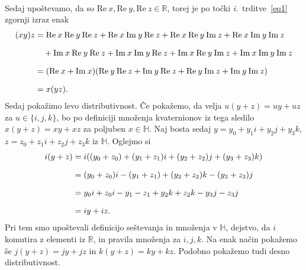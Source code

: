 \documentclass[mat1, tisk]{fmfdelo}
\numberwithin{equation}{section}
\begin{document}
\begin{dokaz}
\begin{equation*}
\begin{aligned}
                \end{aligned}
        \end{equation*}
        Sedaj upoštevamo, da so $\mathrm{Re} \: x, \mathrm{Re} \: y, \mathrm{Re} \: z \in \mathbb{R}$, torej je po točki \textit{i}.\ trditve~\ref{eq1} zgornji izraz enak
        \begin{equation*}
            \setlength{\jot}{10pt}
                \begin{aligned}
                    (xy)z &=  \mathrm{Re} \: x \:\mathrm{Re} \: y \: \mathrm{Re} \: z + \mathrm{Re} \: x \:\mathrm{Im} \: y \: \mathrm{Re} \: z+ \mathrm{Re} \: x \:\mathrm{Re} \: y \: \mathrm{Im} \: z + \mathrm{Re} \: x \:\mathrm{Im} \: y \: \mathrm{Im} \: z\\
                    &\quad + \mathrm{Im} \: x \:\mathrm{Re} \: y \: \mathrm{Re} \: z+ \mathrm{Im} \: x \:\mathrm{Im} \: y \: \mathrm{Re} \: z+ \mathrm{Im} \: x \:\mathrm{Re} \: y \: \mathrm{Im} \: z+ \mathrm{Im} \: x \:\mathrm{Im} \: y \: \mathrm{Im} \: z\\
                    &= (\mathrm{Re} \: x + \mathrm{Im} \: x)(\mathrm{Re} \: y \: \mathrm{Re} \: z + \mathrm{Im} \: y \: \mathrm{Re} \: z + \mathrm{Re} \: y \: \mathrm{Im} \: z + \mathrm{Im} \: y \: \mathrm{Im} \: z) \\
                    &= x(yz).
                \end{aligned}
        \end{equation*}
        Sedaj pokažimo levo distributivnost. Če pokažemo, da velja $u(y + z) = uy + uz$ za $u \in \{i, j, k\}$, bo po definiciji množenja kvaternionov iz tega sledilo
        $x(y + z) = xy + xz$ za poljuben $x \in \mathbb{H}$. Naj bosta sedaj $y = y_{0} + y_{1}i + y_{2}j + y_{3}k$, $z = z_{0} + z_{1}i + z_{2}j + z_{3}k$ iz $\mathbb{H}$. Oglejmo si
        \begin{equation*}
            \setlength{\jot}{10pt}
                \begin{aligned}
                    i(y + z) &=  i((y_{0} + z_0) + (y_{1} + z_1)i + (y_{2} + z_{2})j + (y_{3}+ z_{3})k) \\
                             &= (y_{0} + z_0)i - (y_{1} + z_1) + (y_{2} + z_{2})k -(y_{3}+ z_{3})j \\
                             &= y_{0}i + z_0i - y_{1} - z_1 + y_{2}k + z_{2}k - y_{3}j - z_{3}j \\
                             &= iy + iz.
                \end{aligned}
        \end{equation*}
        Pri tem smo upoštevali definicijo seštevanja in množenja v $\mathbb{H}$, dejstvo, da $i$ komutira z elementi iz $\mathbb{R}$, in pravila množenja
        za $i, j, k$.
        Na enak način pokažemo še $j(y + z) = jy + jz$ in $k(y + z) = ky + kz$. Podobno pokažemo tudi desno distributivnost. 


\end{dokaz}
\end{document}
